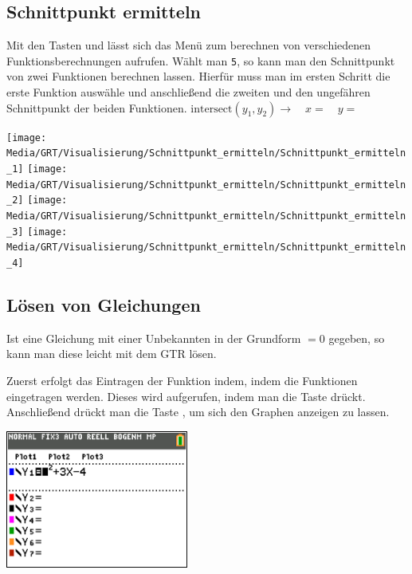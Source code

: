 \subsection{Schnittpunkt ermitteln}\label{sec:Schnittpunkt ermitteln}

\begin{paracol}{2}
\begin{flushleft}
	Mit den Tasten  und  lässt sich das Menü zum berechnen von verschiedenen Funktionsberechnungen aufrufen. Wählt man \texttt{5}, so kann man den Schnittpunkt von zwei Funktionen berechnen lassen. Hierfür muss man im ersten Schritt die erste Funktion auswähle und anschließend die zweiten und den ungefähren Schnittpunkt der beiden Funktionen.
	$\textrm{intersect}(y_1,y_2)\rightarrow \quad x=\quad y=$
\end{flushleft}
\switchcolumn
\begin{flushright}
	\texttt{[image: Media/GRT/Visualisierung/Schnittpunkt\_ermitteln/Schnittpunkt\_ermitteln\_1]}
	\texttt{[image: Media/GRT/Visualisierung/Schnittpunkt\_ermitteln/Schnittpunkt\_ermitteln\_2]}
	\texttt{[image: Media/GRT/Visualisierung/Schnittpunkt\_ermitteln/Schnittpunkt\_ermitteln\_3]}
	\texttt{[image: Media/GRT/Visualisierung/Schnittpunkt\_ermitteln/Schnittpunkt\_ermitteln\_4]}
\end{flushright}
\end{paracol}

\subsection{Lösen von Gleichungen}\label{sec:Loesen von Gleichungen}
Ist eine Gleichung mit einer Unbekannten in der Grundform $=0$ gegeben, so kann man diese leicht mit dem GTR lösen.

\begin{paracol}{2}
	\begin{flushleft}
	Zuerst erfolgt das Eintragen der Funktion indem, indem die Funktionen eingetragen werden. Dieses wird aufgerufen, indem man die Taste  drückt.
		Anschließend drückt man die Taste , um sich den Graphen anzeigen zu lassen. 
	\end{flushleft}
\switchcolumn
	\begin{flushright}
	\includegraphics[width= 6cm]{Media/GRT/Visualisierung/loesen_gleichung/loesen_gleichung_1.png}
		\end{flushright}
\end{paracol}


